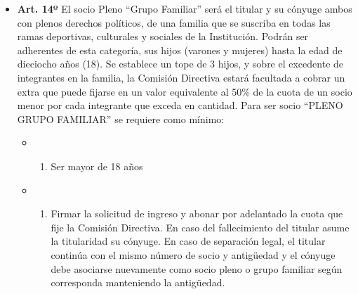 \documentclass[openany]{book}
\providecommand{\tightlist}{%
  \setlength{\itemsep}{0pt}\setlength{\parskip}{0pt}}
\begin{document}
\begin{itemize}
\tightlist
\item
  \textbf{Art. 14º}
  El socio Pleno ``Grupo Familiar'' será el titular y su cónyuge ambos con plenos derechos políticos, de una familia que se suscriba en todas las ramas deportivas, culturales y sociales de la Institución. Podrán ser adherentes de esta categoría, sus hijos (varones y mujeres) hasta la edad de dieciocho años (18). Se establece un tope de 3 hijos, y sobre el excedente de integrantes en la familia, la Comisión Directiva estará facultada a cobrar un extra que puede fijarse en un valor equivalente al 50\% de la cuota de un socio menor por cada integrante que exceda en cantidad. Para ser socio ``PLENO GRUPO FAMILIAR'' se requiere como mínimo:

  \begin{itemize}
  \item
    \begin{enumerate}
    \def\labelenumi{\alph{enumi})}
    \tightlist
    \item
      Ser mayor de 18 años
    \end{enumerate}
  \item
    \begin{enumerate}
    \def\labelenumi{\alph{enumi})}
    \setcounter{enumi}{1}
    \tightlist
    \item
      Firmar la solicitud de ingreso y abonar por adelantado la cuota que fije la Comisión Directiva.
      En caso del fallecimiento del titular asume la titularidad su cónyuge. En caso de separación legal, el titular continúa con el mismo número de socio y antigüedad y el cónyuge debe asociarse nuevamente como socio pleno o grupo familiar según corresponda manteniendo la antigüedad.
    \end{enumerate}
  \end{itemize}
\end{itemize}
\end{document}
